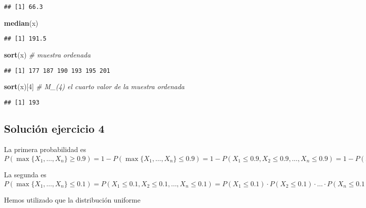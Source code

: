 \documentclass[]{article}
\newenvironment{Shaded}{\begin{snugshade}}{\end{snugshade}}
\newcommand{\CommentTok}[1]{\textcolor[rgb]{0.56,0.35,0.01}{\textit{#1}}}
\newcommand{\DecValTok}[1]{\textcolor[rgb]{0.00,0.00,0.81}{#1}}
\newcommand{\KeywordTok}[1]{\textcolor[rgb]{0.13,0.29,0.53}{\textbf{#1}}}
\newcommand{\NormalTok}[1]{#1}
\begin{document}
\begin{verbatim}
## [1] 66.3
\end{verbatim}

\begin{Shaded}
\begin{Highlighting}[]
\KeywordTok{median}\NormalTok{(x)}
\end{Highlighting}
\end{Shaded}

\begin{verbatim}
## [1] 191.5
\end{verbatim}

\begin{Shaded}
\begin{Highlighting}[]
\KeywordTok{sort}\NormalTok{(x) }\CommentTok{# muestra ordenada}
\end{Highlighting}
\end{Shaded}

\begin{verbatim}
## [1] 177 187 190 193 195 201
\end{verbatim}

\begin{Shaded}
\begin{Highlighting}[]
\KeywordTok{sort}\NormalTok{(x)[}\DecValTok{4}\NormalTok{] }\CommentTok{# M_(4) el cuarto valor de la muestra ordenada}
\end{Highlighting}
\end{Shaded}

\begin{verbatim}
## [1] 193
\end{verbatim}

\hypertarget{soluciuxf3n-ejercicio-4}{%
\subsection{Solución ejercicio 4}\label{soluciuxf3n-ejercicio-4}}

La primera probabilidad es
\(P(\max\{X_1,\ldots,X_n\}\geq 0.9)=1-P(\max\{X_1,\ldots,X_n\}\leq 0.9)=1-P(X_1\leq 0.9,X_2\leq 0.9,\ldots, X_n\leq 0.9)=1-P(X_1\leq 0.9)\cdot P(X_2\leq 0.9)\cdot\ldots\cdot P(X_n\leq 0.9)=1-0.9^10= 0.6513.\)

La segunda es
\(P(\max\{X_1,\ldots,X_n\}\leq 0.1)=P(X_1\leq 0.1,X_2\leq 0.1,\ldots, X_n\leq 0.1)=P(X_1\leq 0.1)\cdot P(X_2\leq 0.1)\cdot\ldots\cdot P(X_n\leq 0.1)=0.1^{10}= \ensuremath{10^{-10}}\)

Hemos utilizado que la distribución uniforme
\end{document}
